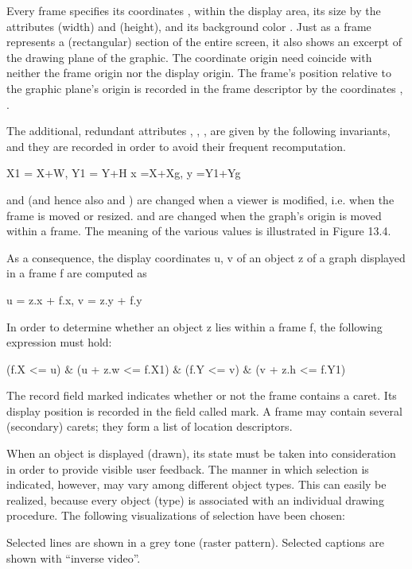 Every frame specifies its coordinates ,  within the display area, its size by the attributes  (width) and  (height), and its background color . Just as a frame represents a (rectangular) section of the entire screen, it also shows an excerpt of the drawing plane of the graphic. The coordinate origin need coincide with neither the frame origin nor the display origin. The frame's position relative to the graphic plane's origin is recorded in the frame descriptor by the coordinates , .

The additional, redundant attributes , , ,  are given by the following invariants, and they are recorded in order to avoid their frequent recomputation.

X1 = X+W, Y1 = Y+H
x =X+Xg, y =Y1+Yg

 and  (and hence also  and ) are changed when a viewer is modified, i.e. when the frame is moved or resized.  and  are changed when the graph's origin is moved within a frame. The meaning of the various values is illustrated in Figure 13.4.


As a consequence, the display coordinates u, v of an object z of a graph displayed in a frame f are computed as

u = z.x + f.x, v = z.y + f.y

In order to determine whether an object z lies within a frame f, the following expression must hold:

(f.X <= u) $\&$ (u + z.w <= f.X1) $\&$ (f.Y <= v) $\&$ (v + z.h <= f.Y1)

The record field marked indicates whether or not the frame contains a caret. Its display position is recorded in the field called mark. A frame may contain several (secondary) carets; they form a list of location descriptors.

When an object is displayed (drawn), its state must be taken into consideration in order to provide visible user feedback. The manner in which selection is indicated, however, may vary among different object types. This can easily be realized, because every object (type) is associated with an individual drawing procedure. The following visualizations of selection have been chosen:

Selected lines are shown in a grey tone (raster pattern). Selected captions are shown with ``inverse video''.

